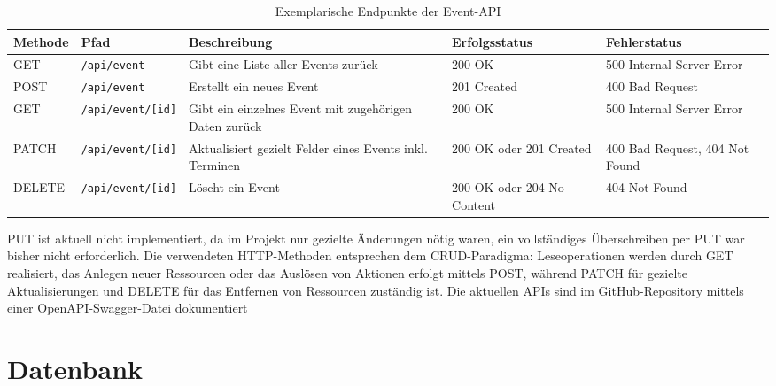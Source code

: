 \documentclass[a4paper,12pt]{article}
\begin{document}
\begin{table}[H]
\centering
\scriptsize
\begin{tabularx}{\textwidth}{|l|l|X|X|X|}
\hline
\textbf{Methode} & \textbf{Pfad} & \textbf{Beschreibung} & \textbf{Erfolgsstatus} & \textbf{Fehlerstatus} \\ \hline
GET    & \texttt{/api/event}         & Gibt eine Liste aller Events zurück                     & 200 OK                            & 500 Internal Server Error           \\ \hline
POST   & \texttt{/api/event}         & Erstellt ein neues Event                                & 201 Created                       & 400 Bad Request                     \\ \hline
GET    & \texttt{/api/event/[id]}    & Gibt ein einzelnes Event mit zugehörigen Daten zurück   & 200 OK                            & 500 Internal Server Error           \\ \hline
PATCH  & \texttt{/api/event/[id]}    & Aktualisiert gezielt Felder eines Events inkl. Terminen & 200 OK oder 201 Created           & 400 Bad Request, 404 Not Found      \\ \hline
DELETE & \texttt{/api/event/[id]}    & Löscht ein Event                                        & 200 OK oder 204 No Content        & 404 Not Found                       \\ \hline
\end{tabularx}
\caption{Exemplarische Endpunkte der Event-API}
\label{tab:api-events}
\end{table}

\noindent
PUT ist aktuell nicht implementiert, da im Projekt nur gezielte Änderungen nötig waren, ein vollständiges Überschreiben per PUT war bisher nicht erforderlich. Die verwendeten HTTP-Methoden entsprechen dem CRUD-Paradigma: Leseoperationen werden durch GET realisiert, das Anlegen neuer Ressourcen oder das Auslösen von Aktionen erfolgt mittels POST, während PATCH für gezielte Aktualisierungen und DELETE für das Entfernen von Ressourcen zuständig ist. Die aktuellen APIs sind im GitHub-Repository mittels einer OpenAPI-Swagger-Datei dokumentiert

\newpage


\section{Datenbank}
\end{document}
